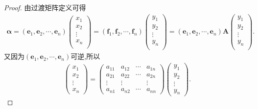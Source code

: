 \documentclass[../../main.tex]{subfiles}%
\begin{document}
\begin{proof}
由过渡矩阵定义可得
\begin{align*}
\boldsymbol{\alpha }=\left( \boldsymbol{e}_1,\boldsymbol{e}_2,\cdots ,\boldsymbol{e}_n \right) \left( \begin{array}{c}
x_1\\
x_2\\
\vdots\\
x_n\\
\end{array} \right) =\left( \boldsymbol{f}_1,\boldsymbol{f}_2,\cdots ,\boldsymbol{f}_n \right) \left( \begin{array}{c}
y_1\\
y_2\\
\vdots\\
y_n\\
\end{array} \right) =\left( \boldsymbol{e}_1,\boldsymbol{e}_2,\cdots ,\boldsymbol{e}_n \right) \boldsymbol{A}\left( \begin{array}{c}
y_1\\
y_2\\
\vdots\\
y_n\\
\end{array} \right) .
\end{align*}
又因为$\left( \boldsymbol{e}_1,\boldsymbol{e}_2,\cdots ,\boldsymbol{e}_n \right) $可逆,所以
\begin{gather*}
\begin{pmatrix}
x_1\\
x_2\\
\vdots\\
x_n
\end{pmatrix}=\begin{pmatrix}
a_{11}&a_{12}&\cdots&a_{1n}\\
a_{21}&a_{22}&\cdots&a_{2n}\\
\vdots&\vdots&&\vdots\\
a_{n1}&a_{n2}&\cdots&a_{nn}
\end{pmatrix}\begin{pmatrix}
y_1\\
y_2\\
\vdots\\
y_n
\end{pmatrix}.
\end{gather*}
\end{proof}
\end{document}
